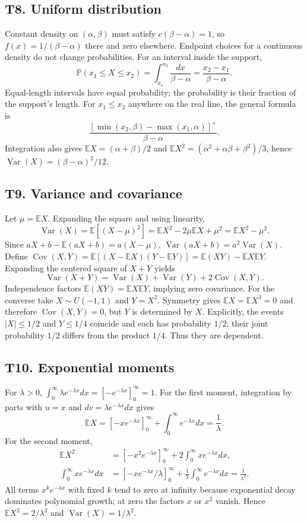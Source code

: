 \documentclass[11pt,a4paper]{article}
\newcommand{\E}{\mathbb E}\newcommand{\Pp}{\mathbb P}
\DeclareMathOperator{\Var}{Var}\DeclareMathOperator{\Cov}{Cov}
\begin{document}
\subsection{T8. Uniform distribution}
Constant density on $(\alpha,\beta)$ must satisfy
$c(\beta-\alpha)=1$, so $f(x)=1/(\beta-\alpha)$ there and zero elsewhere. Endpoint choices for a continuous density do not change probabilities. For an interval inside the support,
\[
\Pp(x_1\leq X\leq x_2)=\int_{x_1}^{x_2}\frac{dx}{\beta-\alpha}
=\frac{x_2-x_1}{\beta-\alpha}.
\]
Equal-length intervals have equal probability; the probability is their fraction of the support's length. For $x_1\leq x_2$ anywhere on the real line, the general formula is
\[
\frac{[\min(x_2,\beta)-\max(x_1,\alpha)]^+}{\beta-\alpha}.
\]
Integration also gives $\E X=(\alpha+\beta)/2$ and $\E X^2=(\alpha^2+\alpha\beta+\beta^2)/3$, hence $\Var(X)=(\beta-\alpha)^2/12$.

\subsection{T9. Variance and covariance}
Let $\mu=\E X$. Expanding the square and using linearity,
\[
\Var(X)=\E[(X-\mu)^2]=\E X^2-2\mu\E X+\mu^2
=\E X^2-\mu^2.
\]
Since $aX+b-\E(aX+b)=a(X-\mu)$,
$\Var(aX+b)=a^2\Var(X)$. Define
$\Cov(X,Y)=\E[(X-\E X)(Y-\E Y)]=\E(XY)-\E X\E Y$.
Expanding the centered square of $X+Y$ yields
\[
\Var(X+Y)=\Var(X)+\Var(Y)+2\Cov(X,Y).
\]
Independence factors $\E(XY)=\E X\E Y$, implying zero covariance. For the converse take $X\sim U(-1,1)$ and $Y=X^2$. Symmetry gives $\E X=\E X^3=0$ and therefore $\Cov(X,Y)=0$, but $Y$ is determined by $X$. Explicitly, the events $|X|\leq1/2$ and $Y\leq1/4$ coincide and each has probability $1/2$; their joint probability $1/2$ differs from the product $1/4$. Thus they are dependent.

\subsection{T10. Exponential moments}
For $\lambda>0$, $\int_0^\infty\lambda e^{-\lambda x}dx=[-e^{-\lambda x}]_0^\infty=1$.
For the first moment, integration by parts with $u=x$ and $dv=\lambda e^{-\lambda x}dx$ gives
\[
\E X=[-xe^{-\lambda x}]_0^\infty+\int_0^\infty e^{-\lambda x}dx=\frac1\lambda.
\]
For the second moment,
\begin{align*}
\E X^2&=[-x^2e^{-\lambda x}]_0^\infty+2\int_0^\infty xe^{-\lambda x}dx,\\
\int_0^\infty xe^{-\lambda x}dx
&=[-xe^{-\lambda x}/\lambda]_0^\infty+
\frac1\lambda\int_0^\infty e^{-\lambda x}dx=\frac1{\lambda^2}.
\end{align*}
All terms $x^k e^{-\lambda x}$ with fixed $k$ tend to zero at infinity because exponential decay dominates polynomial growth; at zero the factors $x$ or $x^2$ vanish. Hence $\E X^2=2/\lambda^2$ and $\Var(X)=1/\lambda^2$.
\end{document}
